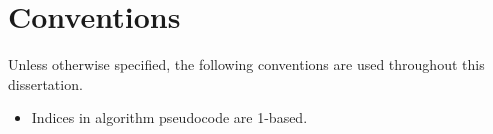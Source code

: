 \chapter*{Conventions}
Unless otherwise specified, the following conventions are used throughout this dissertation.

\begin{itemize}
  \item Indices in algorithm pseudocode are 1-based.
\end{itemize}
